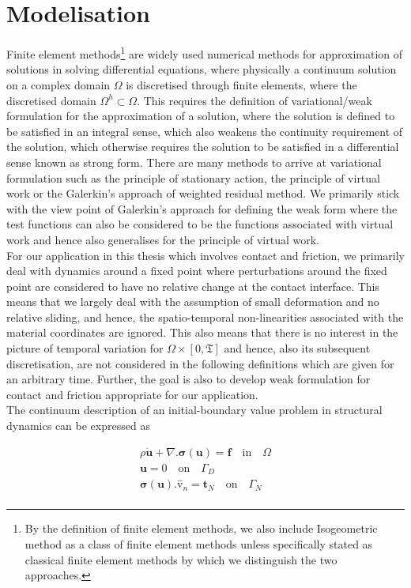 \chapter{Modelisation}
Finite element methods\footnote{By the definition of finite element methods, we also include Isogeometric method as a class of finite element methods unless specifically stated as classical finite element methods by which we distinguish the two approaches.} are widely used numerical methods for approximation of solutions in solving differential equations, where physically a continuum solution on a complex domain $\Omega$ is discretised through finite elements, where the discretised domain $\Omega^h\subset \Omega$. This requires the definition of variational/weak formulation for the approximation of a solution, where the solution is defined to be satisfied in an integral sense, which also weakens the continuity requirement of the solution, which otherwise requires the solution to be satisfied in a differential sense known as strong form. There are many methods to arrive at variational formulation such as the principle of stationary action, the principle of virtual work or the Galerkin's approach of weighted residual method.  We primarily stick with the view point of Galerkin's approach for defining the weak form where the test functions can also be considered to be the functions associated with virtual work and hence also generalises for the principle of virtual work.\\ 

 For our application in this thesis which involves contact and friction, we primarily deal with dynamics around a fixed point where perturbations around the fixed point are considered to have no relative change at the contact interface.
 This means that we largely deal with the assumption of small deformation and no relative sliding, and hence, the spatio-temporal non-linearities associated with the material coordinates are ignored. 
 This also means that there is no interest in the picture of temporal variation for $\Omega \times[0,\mathfrak{T}] $ and hence, also its subsequent discretisation, are not considered in the following definitions which are given for an arbitrary time.
 Further, the goal is also to develop weak formulation for contact and friction appropriate for our application.\\
  
The continuum description of an initial-boundary value problem in structural dynamics can be expressed as

\begin{equation}\label{cont_eq1}
\begin{split}
\rho\bm{\ddot{u}}+\nabla\bm{.}\bm{\sigma}(\bm{u}) = \bm{f}\quad \mathrm{in} \quad \Omega\\ 
\bm{u}= 0\quad \mathrm{on}\quad\Gamma_{D}\\
\bm{\sigma}(\bm{u}).\bm{\hat{\mathrm v}}_n=\bm{t}_{N}\quad\mathrm{on}\quad\Gamma_N\\
\end{split}
\end{equation}

